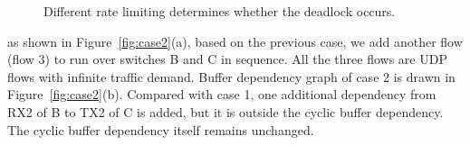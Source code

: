 \begin{figure}[t]
\centering

\vspace{-0.15in}
\caption{Different rate limiting determines whether the deadlock occurs.}
\vspace{-0.15in}
\label{fig:case3}
\end{figure}


 as shown in Figure~\ref{fig:case2}(a), based on the previous case, we 
add another flow (flow 3) to run over switches B and C in sequence. All the three flows are UDP 
flows with infinite traffic demand. Buffer dependency graph of case 2 is drawn in Figure~\ref{fig:case2}(b). 
Compared with case 1, one additional dependency from RX2 of B to TX2 of C is added, but it
is outside the cyclic buffer dependency. The cyclic buffer dependency itself remains unchanged.


